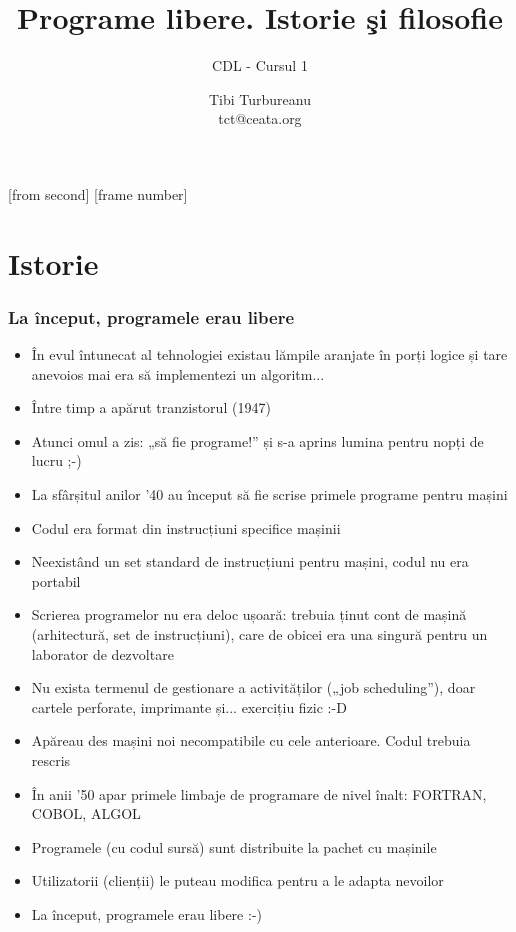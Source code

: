 \documentclass{beamer}
\title[Programe libere]{Programe libere. Istorie \c{s}i filosofie}
\subtitle{CDL - Cursul 1}
\institute{ROSEdu}
\author{Tibi Turbureanu \\ {\small tct@ceata.org}}
\begin{document}
[from second]
[frame number]

\frame{\titlepage}

\frame{\tableofcontents}

\section{Istorie}

\frame{\tableofcontents[currentsection]}

\begin{frame}[allowframebreaks] %
\frametitle{La început, programele erau libere}
\begin{itemize}
\item În evul întunecat al tehnologiei existau lămpile aranjate în porți logice
și tare anevoios mai era să implementezi un algoritm...
\item Între timp a apărut tranzistorul (1947)
\item Atunci omul a zis: „să fie programe!” și s-a aprins lumina pentru nopți
de lucru ;-)
\item La sfârșitul anilor '40 au început să fie scrise primele programe
pentru mașini 
\item Codul era format din instrucțiuni specifice mașinii
\item Neexistând un set standard de instrucțiuni pentru mașini, codul
nu era portabil
\item Scrierea programelor nu era deloc ușoară: trebuia ținut cont de
mașină (arhitectură, set de instrucțiuni), care de obicei era una singură
pentru un laborator de dezvoltare
\item Nu exista termenul de gestionare a activităților („job scheduling”),
doar cartele perforate, imprimante și... exercițiu fizic :-D
\item Apăreau des mașini noi necompatibile cu cele anterioare. Codul trebuia
rescris
\item În anii '50 apar primele limbaje de programare de nivel înalt: FORTRAN,
COBOL, ALGOL
\item Programele (cu codul sursă) sunt distribuite la pachet cu mașinile
\item Utilizatorii (clienții) le puteau modifica pentru a le adapta nevoilor
\item La început, programele erau libere :-)
\end{itemize}
\end{frame}
\end{document}
